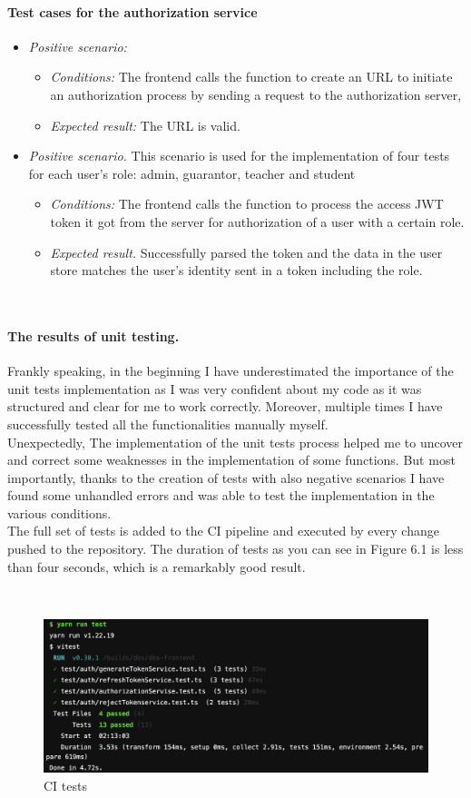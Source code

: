 \paragraph*{Test cases for the authorization service} 
\begin{itemize}
    \item \emph{Positive scenario:} 
        \begin{itemize}
            \item \emph{Conditions:} The frontend calls the function to create an URL to initiate an authorization process by sending a request to the authorization server,
            \item \emph{Expected result:} The URL is valid.
        \end{itemize}
    \item \emph{Positive scenario.} This scenario is used for the implementation of four tests for each user's role: admin, guarantor, teacher and student
        \begin{itemize}
            \item \emph{Conditions:} The frontend calls the function to process the access JWT token it got from the server for authorization of a user with a certain role.
            \item \emph{Expected result.} Successfully parsed the token and the data in the user store matches the user's identity sent in a token including the role.
        \end{itemize}
\end{itemize}

\ 

\paragraph*{The results of unit testing.} Frankly speaking, in the beginning I have underestimated the importance of the unit tests implementation as I was very confident about my code as it was structured and clear for me to work correctly. Moreover, multiple times I have successfully tested all the functionalities manually myself.\\
Unexpectedly, The implementation of the unit tests process helped me to uncover and correct some weaknesses in the implementation of some functions. But most importantly, thanks to the creation of tests with also negative scenarios I have found some unhandled errors and was able to test the implementation in the various conditions.\\
The full set of tests is added to the CI pipeline and executed by every change pushed to the repository. The duration of tests as you can see in Figure 6.1 is less than four seconds, which is a remarkably good result.

 \

\begin{figure}[h]
\centering
\includegraphics[scale=0.47]{../png/tests.png}
\caption{CI tests}\label{picture:tests}
\end{figure}
